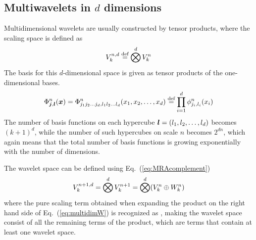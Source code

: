 \subsection{Multiwavelets in $d$ dimensions}
Multidimensional wavelets are usually constructed by tensor products, where the
scaling space is defined as
\begin{equation}
    {V}_{k}^{n,d} \stackrel{\text{def}}{\hbox{=}} \bigotimes^d {V}_{k}^{n}
\end{equation}
The basis for this $d$-dimensional space is given as tensor products of the
one-dimensional bases.
\begin{equation}
    \label{eq:multidimscaling}
    \Phi^n_{\boldsymbol j,\boldsymbol l}(\boldsymbol x) = 
    \Phi^n_{j_1 j_2\dots j_d,l_1 l_2\dots l_d} (x_1,x_2,\dots,x_d) \stackrel{\text{def}}{\hbox{=}}
    \prod_{i=1}^d \phi^n_{j_i,l_i}(x_i)
\end{equation}
The number of basis functions on each hypercube $\boldsymbol l=(l_1,l_2,\dots,l_d)$ 
becomes $(k+1)^d$, while the number of such hypercubes on scale $n$ becomes $2^{dn}$, 
which again means that the total number of basis functions is growing exponentially 
with the number of dimensions.

The wavelet space can be defined using Eq.~(\ref{eq:MRAcomplement})
\begin{equation}
    \label{eq:multidimW}
    {V}_{k}^{n+1,d} = \bigotimes^d {V}_{k}^{n+1} = 
	\bigotimes^d ({V}_{k}^{n} \oplus {W}_{k}^{n})
\end{equation}
where the pure scaling term obtained when expanding the product on the right
hand side of Eq.~(\ref{eq:multidimW}) is recognized as , making the
wavelet space  consist of all the remaining terms of the product, 
which are terms that contain at least one wavelet space.

